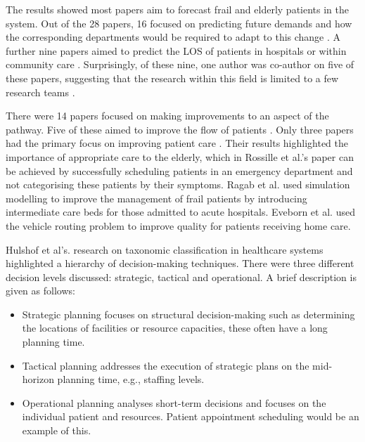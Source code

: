 \documentclass[../thesis.tex]{subfiles}
\begin{document}
The results showed most papers aim to forecast frail and elderly patients in the system. Out of the 28 papers, 16 focused on predicting future demands and how the corresponding departments would be required to adapt to this change \cite{Ambagtsheer, Bae, Borowiak, Christodoulou, Davari, Desai, Gorunescu, Grenouilleau, Hare, Johnson, Katsaliaki, YLi, Bidhandi, Patrick,Zhang1, Zhang2}. A further nine papers aimed to predict the LOS of patients in hospitals or within community care \cite{Abe, Gordon2, Heggestad, Marshall1, Marshall2, Marshall3, Shaw, Taylor, Xie}. Surprisingly, of these nine, one author was co-author on five of these papers, suggesting that the research within this field is limited to a few research teams \cite{Gordon2, Marshall1, Marshall2, Marshall3, Shaw}.

There were 14 papers focused on making improvements to an aspect of the pathway. Five of these aimed to improve the flow of patients \cite{Chaussalet, Hamdani, Rashwan, Silvester, Trevisan}. Only three papers had the primary focus on improving patient care \cite{Eveborn, Ragab, Rossille}. Their results highlighted the importance of appropriate care to the elderly, which in Rossille et al.'s \cite{Rossille} paper can be achieved by successfully scheduling patients in an emergency department and not categorising these patients by their symptoms. Ragab et al. \cite{Ragab} used simulation modelling to improve the management of frail patients by introducing intermediate care beds for those admitted to acute hospitals. Eveborn et al. \cite{Eveborn} used the vehicle routing problem to improve quality for patients receiving home care.

Hulshof et al's. \cite{PHulshof} research on taxonomic classification in healthcare systems highlighted a hierarchy of decision-making techniques. There were three different decision levels discussed: strategic, tactical and operational. A brief description is given as follows:

\begin{itemize}
    \item Strategic planning focuses on structural decision-making such as determining the locations of facilities or resource capacities, these often have a long planning time.
    \item Tactical planning addresses the execution of strategic plans on the mid-horizon planning time, e.g., staffing levels.
    \item Operational planning analyses short-term decisions and focuses on the individual patient and resources. Patient appointment scheduling would be an example of this.
\end{itemize}
\end{document}
